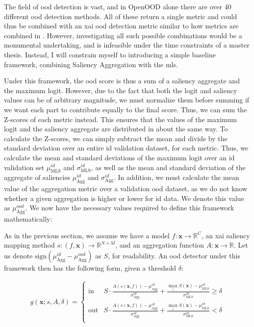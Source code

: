 \documentclass[UKenglish]{uiomasterthesis} %
\newcommand{\R}{\mathbb{R}}
\theoremstyle{definition}
\begin{document}
The field of \ac{ood} detection is vast, and in OpenOOD alone there are over 40 different \ac{ood} detection methods. All of these return a single metric and could thus be combined with an \ac{xai} \ac{ood} detection metric similar to how metrics are combined in \cite{combood}. However, investigating all such possible combinations would be a monumental undertaking, and is infeasible under the time constraints of a master thesis. Instead, I will constrain myself to introducing a simple baseline framework, combining Saliency Aggregation with the \ac{mls}.

Under this framework, the \ac{ood} score is thus a sum of a saliency aggregate and the maximum logit. However, due to the fact that both the logit and saliency values can be of arbitrary magnitude, we must normalize them before summing if we want each part to contribute equally to the final score. Thus, we can sum the Z-scores of each metric instead. This ensures that the values of the maximum logit and the saliency aggregate are distributed in about the same way. To calculate the Z-scores, we can simply subtract the mean and divide by the standard deviation over an entire \ac{id} validation dataset, for each metric. Thus, we calculate the mean and standard deviations of the maximum logit over an \ac{id} validation set $\mu_{\text{MLS}}^{id}$ and $\sigma_{\text{MLS}}^{id}$, as well as the mean and standard deviation of the aggregate of saliencies $\mu_{\text{Agg}}^{id}$ and $\sigma_{\text{Agg}}^{id}$. In addition, we must calculate the mean value of the aggregation metric over a validation \ac{ood} dataset, as we do not know whether a given aggregation is higher or lower for \ac{id} data. We denote this value as $\mu_{\text{Agg}}^{ood}$. We now have the necessary values required to define this framework mathematically:

As in the previous section, we assume we have a model $f: \bm{x} \to \R^C$, an \ac{xai} saliency mapping method $s: (f, \bm{x}) \to \R^{N \times M}$, and an aggregation function $A: \bm{x} \rightarrow \R$. Let us denote $\text{sign}(\mu_{\text{Agg}}^{id} - \mu_{\text{Agg}}^{ood})$ as $S$, for readability. An \ac{ood} detector under this framework then has the following form, given a threshold $\delta$:

{\large
\begin{align}
    g(\bm{x}; s, A, \delta)=\begin{cases} 
    \text{in } &  S \cdot \frac{A(s(\bm{x}, f)) - \mu_{\text{Agg}}^{id}}{\sigma_{\text{Agg}}^{id}} + \frac{\max_i S(\bm{x}) - \mu_{\text{MLS}}^{id}}{\sigma_{\text{MLS}}^{id}} \ge \delta \\[10pt]
    \text{out} &  S \cdot \frac{A(s(\bm{x}, f)) - \mu_{\text{Agg}}^{id}}{\sigma_{\text{Agg}}^{id}} + \frac{\max_i S(\bm{x}) - \mu_{\text{MLS}}^{id}}{\sigma_{\text{MLS}}^{id}} < \delta \\
   \end{cases}
\label{eq:aggregate}
\end{align}
}
\end{document}

